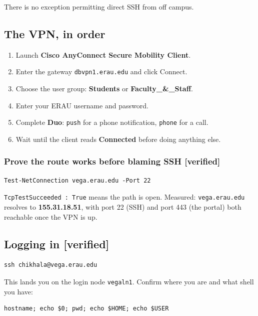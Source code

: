 \documentclass[11pt,a4paper]{article}
\newcommand{\cmd}[1]{\texttt{\small #1}}
\newcommand{\verified}{{\color{good}\textbf{[verified]}}}
\begin{document}
There is no exception permitting direct SSH from off campus.

\subsection{The VPN, in order}

\begin{enumerate}
  \item Launch \textbf{Cisco AnyConnect Secure Mobility Client}.
  \item Enter the gateway \texttt{dbvpn1.erau.edu} and click Connect.
  \item Choose the user group: \textbf{Students} or \textbf{Faculty\_\&\_Staff}.
  \item Enter your ERAU username and password.
  \item Complete \textbf{Duo}: \texttt{push} for a phone notification,
        \texttt{phone} for a call.
  \item Wait until the client reads \textbf{Connected} before doing anything else.
\end{enumerate}

\subsubsection{Prove the route works before blaming SSH \verified}

\begin{lstlisting}
Test-NetConnection vega.erau.edu -Port 22
\end{lstlisting}

\cmd{TcpTestSucceeded : True} means the path is open. Measured:
\texttt{vega.erau.edu} resolves to \textbf{155.31.18.51}, with port 22 (SSH) and
port 443 (the portal) both reachable once the VPN is up.

\subsection{Logging in \verified}

\begin{lstlisting}
ssh chikhala@vega.erau.edu
\end{lstlisting}

This lands you on the login node \texttt{vegaln1}. Confirm where you are and
what shell you have:

\begin{lstlisting}
hostname; echo $0; pwd; echo $HOME; echo $USER
\end{lstlisting}
\end{document}

